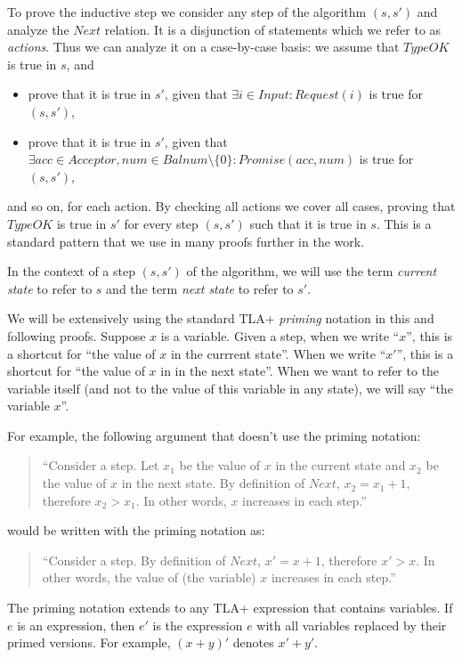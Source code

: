\documentclass[12pt,a4paper,en]{pracamgr}
\newcommand{\ti}[1]{\textit{#1}}
\begin{document}
To prove the inductive step we consider any step of the algorithm $(s, s')$ and analyze the $Next$ relation. It is a disjunction of statements which we refer to as \ti{actions}. Thus we can analyze it on a case-by-case basis: we assume that $TypeOK$ is true in $s$, and
\begin{itemize}
    \item prove that it is true in $s'$, given that $\exists i \in Input: Request(i)$ is true for $(s, s')$,
    \item prove that it is true in $s'$, given that $\exists acc \in Acceptor, num \in Balnum \setminus \{0\}: Promise(acc, num)$ is true for $(s, s')$,
\end{itemize}
and so on, for each action. By checking all actions we cover all cases, proving that $TypeOK$ is true in $s'$ for every step $(s, s')$ such that it is true in $s$. This is a standard pattern that we use in many proofs further in the work.

In the context of a step $(s, s')$ of the algorithm, we will use the term \ti{current state} to refer to $s$ and the term \ti{next state} to refer to $s'$.

We will be extensively using the standard TLA+ \ti{priming} notation in this and following proofs. Suppose $x$ is a variable. Given a step, when we write ``$x$'', this is a shortcut for ``the value of $x$ in the currrent state''. When we write ``$x'$'', this is a shortcut for ``the value of $x$ in in the next state''. When we want to refer to the variable itself (and not to the value of this variable in any state), we will say ``the variable $x$''.

For example, the following argument that doesn't use the priming notation:
\begin{quote}
    ``Consider a step. Let $x_1$ be the value of $x$ in the current state and $x_2$ be the value of $x$ in the next state. By definition of $Next$, $x_2 = x_1 + 1$, therefore $x_2 > x_1$. In other words, $x$ increases in each step.''
\end{quote}
would be written with the priming notation as:
\begin{quote}
    ``Consider a step. By definition of $Next$, $x' = x + 1$, therefore $x' > x$. In other words, the value of (the variable) $x$ increases in each step.''
\end{quote}
The priming notation extends to any TLA+ expression that contains variables. If $e$ is an expression, then $e'$ is the expression $e$ with all variables replaced by their primed versions. For example, $(x + y)'$ denotes $x' + y'$.
\end{document}
